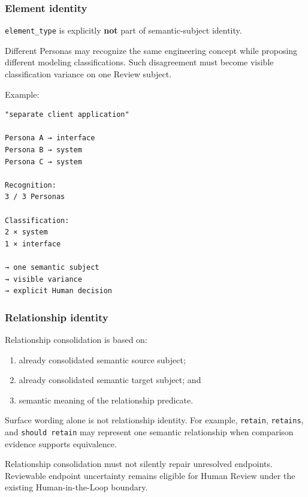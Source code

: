 \hypertarget{element-identity}{%
\subsubsection{Element identity}\label{element-identity}}

\texttt{element\_type} is explicitly \textbf{not} part of semantic-subject identity.

Different Personas may recognize the same engineering concept while proposing different modeling classifications. Such disagreement must become visible classification variance on one Review subject.

Example:

\begin{verbatim}
"separate client application"

Persona A → interface
Persona B → system
Persona C → system

Recognition:
3 / 3 Personas

Classification:
2 × system
1 × interface

→ one semantic subject
→ visible variance
→ explicit Human decision
\end{verbatim}

\hypertarget{relationship-identity}{%
\subsubsection{Relationship identity}\label{relationship-identity}}

Relationship consolidation is based on:

\begin{enumerate}
\def\labelenumi{\arabic{enumi}.}
\tightlist
\item
  already consolidated semantic source subject;
\item
  already consolidated semantic target subject; and
\item
  semantic meaning of the relationship predicate.
\end{enumerate}

Surface wording alone is not relationship identity. For example, \texttt{retain}, \texttt{retains}, and \texttt{should\ retain} may represent one semantic relationship when comparison evidence supports equivalence.

Relationship consolidation must not silently repair unresolved endpoints. Reviewable endpoint uncertainty remains eligible for Human Review under the existing Human-in-the-Loop boundary.

